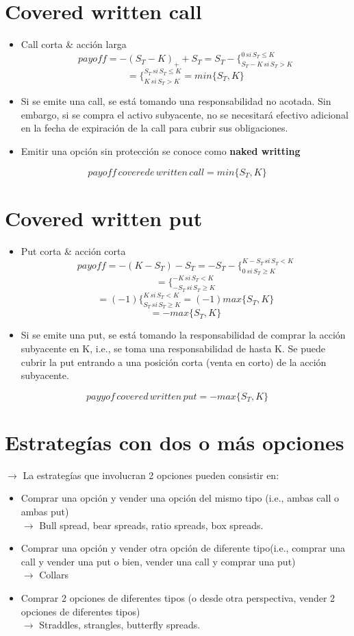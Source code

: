 \documentclass[12pts]{extarticle}
\begin{document}
\section{Covered written call} 
\begin{itemize} 
\item Call corta \& acción larga
$$payoff=-(S_T-K)_+ + S_T=S_T- \Bigg \{_{S_T-K \, si \, S_T >K}^{0 \, si \, S_T \leq K}$$
$$ =\Bigg \{_{K \, si \, S_T >K}^{S_T \, si \, S_T \leq K} = min\{ S_T, K\}$$
\item Si se emite una call, se está tomando una responsabilidad no acotada. Sin embargo, si se compra el activo subyacente, no se necesitará efectivo adicional en la fecha de expiración de la call para cubrir sus obligaciones. 
\item Emitir una opción sin protección se conoce como \textbf{ naked writting} 
\end{itemize}
$$payoff  \, coverede \, written \, call = min\{S_T,K\}$$

\section{Covered written put}
\begin{itemize} 
\item Put corta \& acción corta
$$payoff = -(K-S_T) - S_T=-S_T- \Bigg \{_{0 \, si \, S_T \geq K}^{K-S_T \, si \, S_T < K}$$
$$=\Bigg \{_{-S_T \, si \, S_T \geq K}^{-K \, si \, S_T < K}$$
$$=(-1) \Bigg \{_{S_T \, si \, S_T \geq K}^{K \, si \, S_T < K}=(-1) max\{ S_T, K\}$$
$$=-max\{S_T, K\}$$
\item Si se emite una put, se está tomando la responsabilidad de comprar la acción subyacente en K, i.e., se toma una responsabilidad de hasta K. Se puede cubrir la put entrando a una posición corta (venta en corto) de la acción subyacente.
\end{itemize} 
$$payyof \, covered \, written  \, put = -max\{S_T,K\}$$
\section{Estrategías con dos o más opciones} 
$\rightarrow$ La estrategías que involucran 2 opciones pueden consistir en:
\begin{itemize}
\item Comprar una opción y vender una opción del mismo tipo (i.e., ambas call o ambas put)\\ 
$\rightarrow$ Bull spread, bear spreads, ratio spreads, box spreads. 
\item Comprar una opción y vender otra opción de diferente tipo(i.e., comprar una call y vender una put o bien, vender una call y comprar una put) \\ 
$\rightarrow$ Collars
\item Comprar 2 opciones de diferentes tipos (o desde otra perspectiva, vender 2 opciones de diferentes tipos) \\
$\rightarrow$ Straddles, strangles, butterfly spreads.  
\end{itemize}
\end{document}
